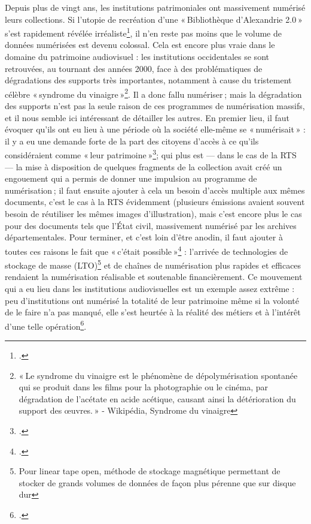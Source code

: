 Depuis plus de vingt ans, les institutions patrimoniales ont massivement numérisé leurs collections. Si l’utopie de recréation d’une « Bibliothèque d’Alexandrie 2.0 » s’est rapidement révélée irréaliste\footcite[p. 20]{bermes2024}, il n’en reste pas moins que le volume de données numérisées est devenu colossal. Cela est encore plus vraie dans le domaine du patrimoine audiovisuel : les institutions occidentales se sont retrouvées, au tournant des années 2000, face à des problématiques de dégradations des supports très importantes, notamment à cause du tristement célèbre « syndrome du vinaigre »\footnote{« Le syndrome du vinaigre est le phénomène de dépolymérisation spontanée qui se produit dans les films pour la photographie ou le cinéma, par dégradation de l’acétate en acide acétique, causant ainsi la détérioration du support des œuvres. » - Wikipédia, Syndrome du vinaigre}. Il a donc fallu numériser ; mais la dégradation des supports n’est pas la seule raison de ces programmes de numérisation massifs, et il nous semble ici intéressant de détailler les autres. En premier lieu, il faut évoquer qu'ils ont eu lieu à une période où la société elle-même se « numérisait » : il y a eu une demande forte de la part des citoyens d’accès à ce qu’ils considéraient comme « leur patrimoine »\footcite{rezzonico2023}; qui plus est — dans le cas de la RTS — la mise à disposition de quelques fragments de la collection avait créé un engouement qui a permis de donner une impulsion au programme de numérisation ; il faut ensuite ajouter à cela un besoin d’accès multiple aux mêmes documents, c’est le cas à la RTS évidemment (plusieurs émissions avaient souvent besoin de réutiliser les mêmes images d’illustration), mais c’est encore plus le cas pour des documents tels que l’État civil, massivement numérisé par les archives départementales. Pour terminer, et c’est loin d’être anodin, il faut ajouter à toutes ces raisons le fait que « c’était possible »\footcite{barcella2024a} : l’arrivée de technologies de stockage de masse (LTO)\footnote{Pour linear tape open, méthode de stockage magnétique permettant de stocker de grands volumes de données de façon plus pérenne que sur disque dur} et de chaînes de numérisation plus rapides et efficaces rendaient la numérisation réalisable et soutenable financièrement. Ce mouvement qui a eu lieu dans les institutions audiovisuelles est un exemple assez extrême : peu d’institutions ont numérisé la totalité de leur patrimoine même si la volonté de le faire n’a pas manqué, elle s’est heurtée à la réalité des métiers et à l’intérêt d’une telle opération\footcite[p. 21]{bermes2024}.

